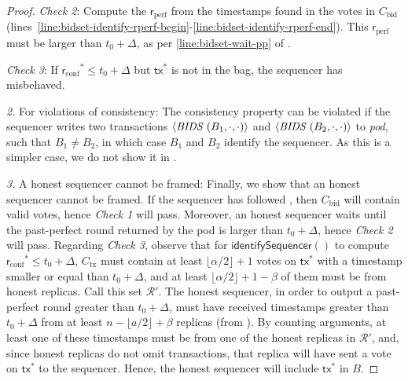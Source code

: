 \documentclass[pdflatex,sn-mathphys-num]{sn-jnl}%
\theoremstyle{thmstyleone}%
\theoremstyle{thmstyletwo}%
\theoremstyle{thmstylethree}%
\newcommand{\podtm}{\textsf{pod}\xspace}
\newcommand{\bidcert}{\ensuremath{C_\text{bid}}\xspace}
\newcommand{\CR}{\ensuremath{\mathcal{R}}\xspace}
\newcommand{\operand}[1]{\textsf{#1}}
\newcommand{\tx}{\operand{tx}\xspace}
\newcommand{\round}{\operand{r}\xspace}
\newcommand{\rconf}{\ensuremath{\round_\text{conf}}\xspace}
\newcommand{\rperf}{\ensuremath{\round_\text{perf}}\xspace}
\newcommand{\allreps}{\CR}
\newcommand{\identifySequencer}[1]{\ensuremath{\mathsf{identifySequencer}(#1)}\xspace}
\newcommand{\txcert}{\ensuremath{C_\text{tx}}\xspace}
\newcommand{\msg}[2]{\ensuremath{\langle\textit{\uppercase{#1 }}#2\rangle}\xspace}
\newcommand{\msgbidresult}[1]{\msg{bids}{ #1}}
\let\oldalpha\alpha
\renewcommand{\alpha}{\ensuremath{\oldalpha}\xspace}
\let\oldbeta\beta
\renewcommand{\beta}{\ensuremath{\oldbeta}\xspace}
\newcommand{\tzero}{\ensuremath{t_0}\xspace}
\newcommand{\bag}{\ensuremath{B}\xspace}
\newcommand{\podInst}{\textit{pod}\xspace}
\begin{document}
\begin{appendices}
\begin{proof}
    \emph{Check 2}: Compute the \rperf from the timestamps found in the votes in \bidcert (lines~\ref{line:bidset-identify-rperf-begin}-\ref{line:bidset-identify-rperf-end}). This \rperf must be larger than $\tzero + \Delta$, as per \cref{line:bidset-wait-pp} of .

    \emph{Check 3}: If $\rconf^* \leq \tzero+\Delta$ but $\tx^*$ is not in the bag, the sequencer has misbehaved.

    \noindent\emph{2.} For violations of consistency:
    The consistency property can be violated if the sequencer writes two transactions $\msgbidresult{(\bag_1, \cdot, \cdot)}$ and $\msgbidresult{(\bag_2, \cdot,\cdot)}$ to \podInst, such that $\bag_1 \neq \bag_2$, in which case $\bag_1$ and $\bag_2$ identify the sequencer. As this is a simpler case, we do not show it in .

    \noindent\emph{3.} A honest sequencer cannot be framed:
    Finally, we show that an honest sequencer cannot be framed.
    If the sequencer has followed , then \bidcert will contain valid votes, hence \emph{Check 1} will pass.
    Moreover, an honest sequencer waits until the past-perfect round returned by the \podtm is larger than $\tzero + \Delta$, hence \emph{Check 2} will pass.
    Regarding \emph{Check 3}, observe that
    for \identifySequencer{} to compute $\rconf^* \leq \tzero+\Delta$, \txcert must contain at least $\lfloor \alpha/2 \rfloor + 1$ votes on $\tx^*$ with a timestamp smaller or equal than $\tzero+\Delta$, and at least $\lfloor \alpha/2 \rfloor + 1 - \beta$ of them must be from honest replicas. Call this set $\allreps'$.
    The honest sequencer, in order to output a past-perfect round greater than $\tzero+\Delta$, must have received timestamps greater than $\tzero+\Delta$ from at least $n - \lfloor a/2 \rfloor + \beta$ replicas (from ).
    By counting arguments, at least one of these timestamps must be from one of the honest replicas in $\allreps'$, and, since honest replicas do not omit transactions, that replica will have sent a vote on $\tx^*$ to the sequencer. Hence, the honest sequencer will include $\tx^*$ in \bag.
\end{proof}


\end{appendices}
\end{document}
